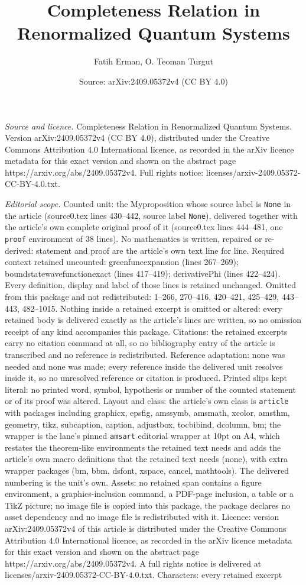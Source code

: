 \documentclass[10pt,a4paper]{amsart}
\title[Completeness Relation in Renormalized Quantum Systems]{Completeness Relation in Renormalized Quantum Systems}
\author{Fatih Erman, O. Teoman Turgut}
\date{Source: arXiv:2409.05372v4 (CC BY 4.0)}
\begin{document}
\maketitle

\noindent\emph{Source and licence.} Completeness Relation in Renormalized Quantum Systems. Version arXiv:2409.05372v4 (CC BY 4.0), distributed under the Creative Commons Attribution 4.0 International licence, as recorded in the arXiv licence metadata for this exact version and shown on the abstract page https://arxiv.org/abs/2409.05372v4. Full rights notice: licenses/arxiv-2409.05372-CC-BY-4.0.txt.\par\smallskip

\noindent\textit{Editorial scope.} Counted unit: the Myproposition whose source label is \texttt{None} in the article (source0.tex lines 430--442, source label \texttt{None}), delivered together with the article's own complete original proof of it (source0.tex lines 444--481, one \texttt{proof} environment of 38 lines). No mathematics is written, repaired or re-derived: statement and proof are the article's own text line for line. Required context retained uncounted: greenfuncexpansion (lines 267--269); boundstatewavefunctionexact (lines 417--419); derivativePhi (lines 422--424). Every definition, display and label of those lines is retained unchanged. Omitted from this package and not redistributed: 1--266, 270--416, 420--421, 425--429, 443--443, 482--1015. Nothing inside a retained excerpt is omitted or altered: every retained body is delivered exactly as the article's lines are written, so no omission receipt of any kind accompanies this package. Citations: the retained excerpts carry no citation command at all, so no bibliography entry of the article is transcribed and no reference is redistributed. Reference adaptation: none was needed and none was made; every reference inside the delivered unit resolves inside it, so no unresolved reference or citation is produced. Printed slips kept literal: no printed word, symbol, hypothesis or number of the counted statement or of its proof was altered. Layout and class: the article's own class is \texttt{article} with packages including graphicx, epsfig, amssymb, amsmath, xcolor, amsthm, geometry, tikz, subcaption, caption, adjustbox, tocbibind, dcolumn, bm; the wrapper is the lane's pinned \texttt{amsart} editorial wrapper at 10pt on A4, which restates the theorem-like environments the retained text needs and adds the article's own macro definitions that the retained text needs (none), with extra wrapper packages (bm, bbm, dsfont, xspace, cancel, mathtools). The delivered numbering is the unit's own. Assets: no retained span contains a figure environment, a graphics-inclusion command, a PDF-page inclusion, a table or a TikZ picture; no image file is copied into this package, the package declares no asset dependency and no image file is redistributed with it. Licence: version arXiv:2409.05372v4 of this article is distributed under the Creative Commons Attribution 4.0 International licence, as recorded in the arXiv licence metadata for this exact version and shown on the abstract page https://arxiv.org/abs/2409.05372v4. A full rights notice is delivered at licenses/arxiv-2409.05372-CC-BY-4.0.txt. Characters: every retained excerpt 
\end{document}
